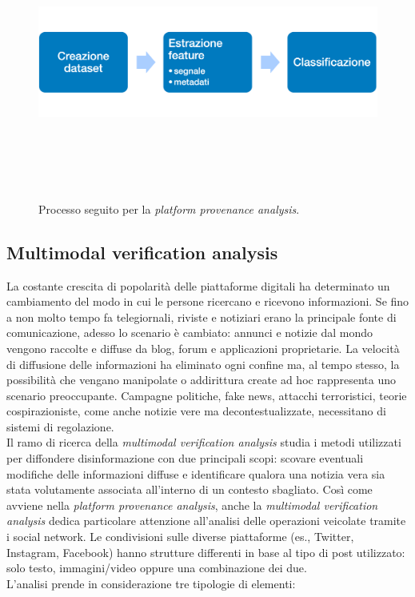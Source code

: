 \begin{figure}[h!]
    \centering
    \includegraphics[width=12cm,height=9cm,keepaspectratio]{Immagini/platform_provenance_analysis.png}
    \caption{Processo seguito per la \textit{platform provenance analysis}.}
    \label{fig:plat_prov_analy}
\end{figure}

\subsection{Multimodal verification analysis}
\label{sub_sec:multimodal_verification_analysis}

La costante crescita di popolarità delle piattaforme digitali ha determinato un cambiamento del modo in cui le persone ricercano e ricevono informazioni. Se fino a non molto tempo fa telegiornali, riviste e notiziari erano la principale fonte di comunicazione, adesso lo scenario è cambiato: annunci e notizie dal mondo vengono raccolte e diffuse da blog, forum e applicazioni proprietarie. La velocità di diffusione delle informazioni ha eliminato ogni confine ma, al tempo stesso, la possibilità che vengano manipolate o addirittura create ad hoc rappresenta uno scenario preoccupante. Campagne politiche, fake news, attacchi terroristici, teorie cospirazioniste, come anche notizie vere ma decontestualizzate, necessitano di sistemi di regolazione.\\
Il ramo di ricerca della \textit{multimodal verification analysis} studia i metodi utilizzati per diffondere disinformazione con due principali scopi: scovare eventuali modifiche delle informazioni diffuse e identificare qualora una notizia vera sia stata volutamente associata all'interno di un contesto sbagliato. Così come avviene nella \textit{platform provenance analysis}, anche la \textit{multimodal verification analysis} dedica particolare attenzione all'analisi delle operazioni veicolate tramite i social network. Le condivisioni sulle diverse piattaforme (es., Twitter, Instagram, Facebook) hanno strutture differenti in base al tipo di post utilizzato: solo testo, immagini/video oppure una combinazione dei due.\\
L'analisi prende in considerazione tre tipologie di elementi:

